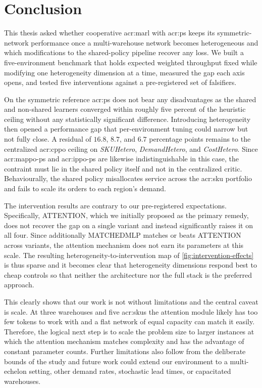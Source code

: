 \chapter{Conclusion}
\label{chap:conclusion}

This thesis asked whether cooperative \gls{acr:marl} with \gls{acr:ps} keeps its
symmetric-network performance once a multi-warehouse network becomes heterogeneous
and which modifications to the shared-policy pipeline recover any loss. We built a
five-environment benchmark that holds expected weighted throughput fixed while
modifying one heterogeneity dimension at a time, measured the gap each axis opens, and tested five interventions against a pre-registered set of falsifiers.

On the symmetric reference \gls{acr:ps} does not bear any disadvantages as the shared and
non-shared learners converged within roughly five percent of the heuristic ceiling
without any statistically significant difference. Introducing heterogeneity then opened a performance gap that
per-environment tuning could narrow but not fully close. A residual of $16.8$, $8.7$, and $6.7$ percentage points remains to the centralized \gls{acr:cppo} ceiling on \textit{SKUHetero}, \textit{DemandHetero}, and \textit{CostHetero}. Since \gls{acr:mappo-ps} and \gls{acr:ippo-ps} are likewise indistinguishable in this case, the contraint must lie in the shared policy itself and not in the centralized critic. Behaviourally, the shared policy misallocates service across the \gls{acr:sku} portfolio and fails to scale its orders to each region's demand.

The intervention results are contrary to our pre-registered expectations. Specifically, ATTENTION, which we initially proposed as the primary remedy, does not recover the gap on a single variant and instead significantly raises it on all four. Since additionally MATCHEDMLP matches or beats ATTENTION across variants, the attention mechanism does not earn its parameters at this scale. The resulting
heterogeneity-to-intervention map of \autoref{fig:intervention-effects} is thus sparse and it becomes clear that heterogeneity dimensions respond best to cheap controls so that neither the architecture nor the full stack is the preferred approach.

This clearly shows that our work is not without limitations and the central caveat is scale. At three warehouses and five \glspl{acr:sku} the attention module likely has too few tokens to work with and a flat network of equal capacity can match it easily. Therefore, the logical next step is to scale the problem size to larger instances at which the attention mechanism matches complexity and has the advantage of constant parameter counts. Further limitations also follow from the deliberate bounds of the study and future work could extend our environment to a multi-echelon setting, other demand rates, stochastic lead times, or capacitated warehouses. 

